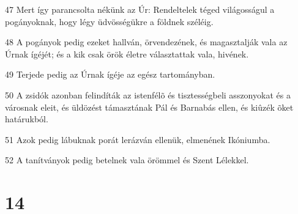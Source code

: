 \par 47 Mert így parancsolta nékünk az Úr: Rendeltelek téged világosságul a pogányoknak, hogy légy üdvösségükre a földnek széléig.
\par 48 A pogányok pedig ezeket hallván, örvendezének, és magasztalják vala az Úrnak ígéjét; és a kik csak örök életre választattak vala, hivének.
\par 49 Terjede pedig az Úrnak ígéje az egész tartományban.
\par 50 A zsidók azonban felindíták az istenfélõ és tisztességbeli asszonyokat és a városnak eleit, és üldözést támasztának Pál és Barnabás ellen, és kiûzék õket határukból.
\par 51 Azok pedig lábuknak porát lerázván ellenük, elmenének Ikóniumba.
\par 52 A tanítványok pedig betelnek vala örömmel és Szent Lélekkel.

\chapter{14}


